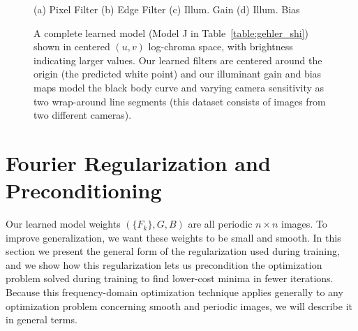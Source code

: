 \documentclass[10pt,twocolumn,letterpaper]{article}
\begin{document}
\begin{figure}[!]
\centering
    {\footnotesize (a) Pixel Filter \label{fig:filter_pixel}}
    {\footnotesize (b) Edge Filter \label{fig:filter_edge}}
    {\footnotesize (c) Illum. Gain \label{fig:blackbody_gain}}
    {\footnotesize (d) Illum. Bias \label{fig:blackbody_bias}}
  \caption{
  A complete learned model (Model J in Table~\ref{table:gehler_shi})
  shown in centered $(u,v)$ log-chroma space, with brightness indicating
  larger values.
  Our learned filters are centered around the origin
  (the predicted white point)
  and our illuminant gain and bias maps model the black body curve and
  varying camera sensitivity as two wrap-around line segments (this dataset
  consists of images from two different cameras).
  \label{fig:blackbody}
  }
\end{figure}

\section{Fourier Regularization and Preconditioning}
\label{sec:fourier}

Our learned model weights $( \{ F_k \}, G, B )$ are all periodic $n \times n$ images.
To improve generalization, we want these weights to be small and smooth.
In this section we present the general form of the regularization used during
training, and we show how this regularization lets us precondition the
optimization problem solved during training to find lower-cost minima in fewer
iterations.
Because this frequency-domain optimization technique applies
generally to any optimization problem concerning smooth and periodic images,
we will describe it in general terms.
\end{document}
